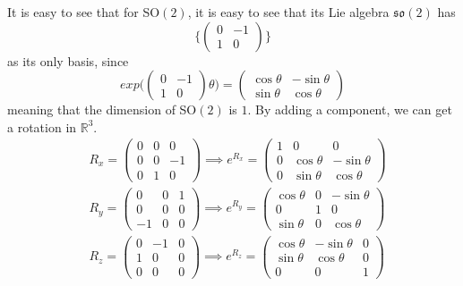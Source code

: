 \documentclass{article}
\begin{document}
      It is easy to see that for SO$(2)$, it is easy to see that its Lie algebra $\mathfrak{so}(2)$ has 
      \begin{equation}
        \bigg\{ \begin{pmatrix}
        0&-1\\1&0
        \end{pmatrix}\bigg\}
      \end{equation}
      as its only basis, since 
      \begin{equation}
        exp  \bigg( \begin{pmatrix}
        0&-1\\1&0
        \end{pmatrix} \theta \bigg) = \begin{pmatrix}
        \cos{\theta} & - \sin{\theta} \\
        \sin{\theta} & \cos{\theta}
        \end{pmatrix}
      \end{equation}
      meaning that the dimension of SO$(2)$ is $1$. By adding a component, we can get a rotation in $\mathbb{R}^3$. 
      \begin{align*}
        & R_x = \begin{pmatrix}0&0&0\\0&0&-1\\0&1&0\end{pmatrix} \implies e^{R_x} = \begin{pmatrix}
        1&0&0\\ 0&\cos{\theta}&-\sin{\theta}\\0&\sin{\theta}&\cos{\theta}
        \end{pmatrix}\\
        & R_y = \begin{pmatrix}0&0&1\\0&0&0\\-1&0&0\end{pmatrix} \implies e^{R_y} = \begin{pmatrix}
        \cos{\theta} & 0 & -\sin{\theta}\\ 0&1&0 \\
        \sin{\theta}& 0 & \cos{\theta} \end{pmatrix} \\
        & R_z = \begin{pmatrix}0&-1&0\\1&0&0\\0&0&0\end{pmatrix} \implies e^{R_z} = \begin{pmatrix}
        \cos{\theta} & -\sin{\theta} & 0\\
        \sin{\theta}& \cos{\theta} & 0 \\ 0 & 0 & 1\end{pmatrix}
      \end{align*}
\end{document}
